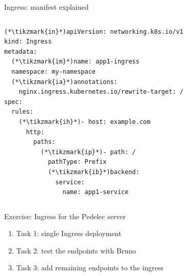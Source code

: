 \begin{frame}[fragile]{Ingress: manifest explained}
  \begin{columns}[T]
      \begin{yamlbox}
\begin{lstlisting}[style=wsyamlstyle, basicstyle=\ttfamily\tiny]
(*\tikzmark{in}*)apiVersion: networking.k8s.io/v1
kind: Ingress
metadata:
  (*\tikzmark{im}*)name: app1-ingress
  namespace: my-namespace
  (*\tikzmark{ia}*)annotations:
    nginx.ingress.kubernetes.io/rewrite-target: /
spec:
  rules:
    (*\tikzmark{ih}*)- host: example.com
      http:
        paths:
          (*\tikzmark{ip}*)- path: /
            pathType: Prefix
            (*\tikzmark{ib}*)backend:
              service:
                name: app1-service
\end{lstlisting}
      \end{yamlbox}
  \end{columns}
\end{frame}

\begin{frame}{\exicon Exercise: Ingress for the Pedelec server}
  \begin{enumerate}
    \item Task 1: single Ingress deployment
    \item Task 2: test the endpoints with Bruno
    \item Task 3: add remaining endpoints to the ingress
  \end{enumerate}
\end{frame}

